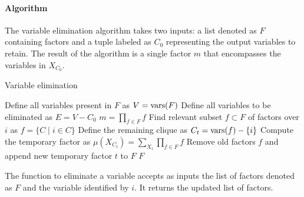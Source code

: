 \paragraph*{Algorithm}
The variable elimination algorithm takes two inputs: a list denoted as $F$ containing factors and a tuple labeled as $C_0$ representing the output variables to retain. 
The result of the algorithm is a single factor $m$ that encompasses the variables in $X_{C_0}$.
\begin{algorithm}[H]
    \caption{Variable elimination}
        \begin{algorithmic}[1]
                \State Define all variables present in $F$ as $V=\textnormal{vars}(F)$
                \State Define all variables to be eliminated as $E= V-C_0$
                    \State {}
                \EndFor
                    \State $m = \prod_{f \in F}f$
                \EndFor
            \EndProcedure 
            \Statex 
                \State Find relevant subset $f \subset F$ of factors over $i$ as $f =\{C\mid i\in C\}$
                \State Define the remaining clique as $C_t = \textnormal{vars}(f)-\{i\}$
                \State Compute the temporary factor as $\mu(X_{C_t})=\sum_{X_i}\prod_{f \in F}f$
                \State Remove old factors $f$ and append new temporary factor $t$ to $F$
                \State \Return $F$
            \EndFunction
        \end{algorithmic}
\end{algorithm}
The function to eliminate a variable accepts as inputs the list of factors denoted as $F$ and the variable identified by $i$. 
It returns the updated list of factors.
